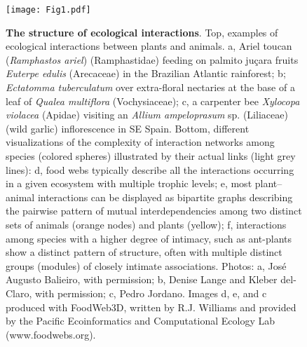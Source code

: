 \documentclass[10pt,letterpaper]{article}
\begin{document}
\begin{figure}[h]
\begin{adjustwidth}{-2.25in}{0in}
\caption{\textbf{The structure of ecological interactions}. Top, examples of ecological interactions between plants and animals. a, Ariel toucan (\textit{Ramphastos ariel}) (Ramphastidae) feeding on palmito juçara fruits \textit{Euterpe edulis} (Arecaceae) in the Brazilian Atlantic rainforest; b; \textit{Ectatomma tuberculatum} over extra-floral nectaries at the base of a leaf of \textit{Qualea multiflora} (Vochysiaceae); c, a carpenter bee \textit{Xylocopa violacea} (Apidae) visiting an \textit{Allium ampeloprasum} sp. (Liliaceae) (wild garlic) inflorescence in SE Spain. Bottom, different visualizations of the complexity of interaction networks among species (colored spheres) illustrated by their actual links (light grey lines): d, food webs typically describe all the interactions occurring in a given ecosystem with multiple trophic levels; e, most plant–animal interactions can be displayed as bipartite graphs describing the pairwise pattern of mutual interdependencies among two distinct sets of animals (orange nodes) and plants (yellow); f, interactions among species with a higher degree of intimacy, such as ant-plants show a distinct pattern of structure, often with multiple distinct groups (modules) of closely intimate associations. Photos: a, José Augusto Balieiro, with permission; b, Denise Lange and Kleber del-Claro, with permission; c, Pedro Jordano. Images d, e, and c produced with FoodWeb3D, written by R.J. Williams and provided by the Pacific Ecoinformatics and Computational Ecology Lab (www.foodwebs.org).}
\label{fig1}
  \begin{center}
    \texttt{[image: Fig1.pdf]}
  \end{center}
\end{adjustwidth}
\end{figure}
\end{document}
